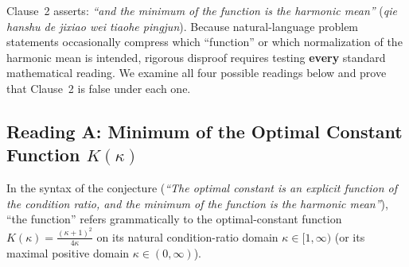 \documentclass[11pt,a4paper]{article}
\theoremstyle{definition}
\begin{document}
Clause~2 asserts: \emph{``and the minimum of the function is the harmonic mean''}
(\emph{qie hanshu de jixiao wei tiaohe pingjun}). Because natural-language
problem statements occasionally compress which ``function'' or which
normalization of the harmonic mean is intended, rigorous disproof requires
testing \textbf{every} standard mathematical reading. We examine all four
possible readings below and prove that Clause~2 is false under each one.

\subsection{Reading A: Minimum of the Optimal Constant Function \texorpdfstring{$K(\kappa)$}{K(kappa)}}

In the syntax of the conjecture (\emph{``The optimal constant is an explicit
function of the condition ratio, and the minimum of the function is the harmonic
mean''}), ``the function'' refers grammatically to the optimal-constant function
$K(\kappa) = \frac{(\kappa + 1)^2}{4\kappa}$ on its natural condition-ratio
domain $\kappa \in [1, \infty)$ (or its maximal positive domain
$\kappa \in (0, \infty)$).
\end{document}
